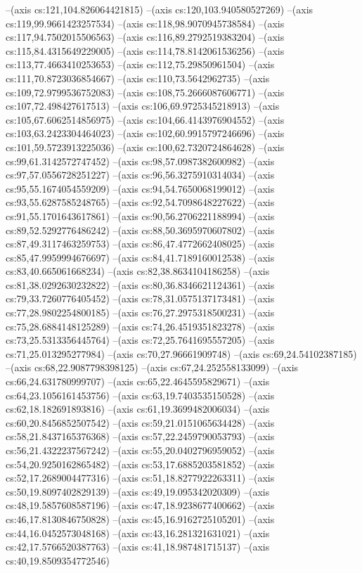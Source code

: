 --(axis cs:121,104.826064421815)
--(axis cs:120,103.940580527269)
--(axis cs:119,99.9661423257534)
--(axis cs:118,98.9070945738584)
--(axis cs:117,94.7502015506563)
--(axis cs:116,89.2792519383204)
--(axis cs:115,84.4315649229005)
--(axis cs:114,78.8142061536256)
--(axis cs:113,77.4663410253653)
--(axis cs:112,75.29850961504)
--(axis cs:111,70.8723036854667)
--(axis cs:110,73.5642962735)
--(axis cs:109,72.9799536752083)
--(axis cs:108,75.2666087606771)
--(axis cs:107,72.498427617513)
--(axis cs:106,69.9725345218913)
--(axis cs:105,67.6062514856975)
--(axis cs:104,66.4143976904552)
--(axis cs:103,63.2423304464023)
--(axis cs:102,60.9915797246696)
--(axis cs:101,59.5723913225036)
--(axis cs:100,62.7320724864628)
--(axis cs:99,61.3142572747452)
--(axis cs:98,57.0987382600982)
--(axis cs:97,57.0556728251227)
--(axis cs:96,56.3275910314034)
--(axis cs:95,55.1674054559209)
--(axis cs:94,54.7650068199012)
--(axis cs:93,55.6287585248765)
--(axis cs:92,54.7098648227622)
--(axis cs:91,55.1701643617861)
--(axis cs:90,56.2706221188994)
--(axis cs:89,52.5292776486242)
--(axis cs:88,50.3695970607802)
--(axis cs:87,49.3117463259753)
--(axis cs:86,47.4772662408025)
--(axis cs:85,47.9959994676697)
--(axis cs:84,41.7189160012538)
--(axis cs:83,40.665061668234)
--(axis cs:82,38.8634104186258)
--(axis cs:81,38.0292630232822)
--(axis cs:80,36.8346621124361)
--(axis cs:79,33.7260776405452)
--(axis cs:78,31.0575137173481)
--(axis cs:77,28.9802254800185)
--(axis cs:76,27.2975318500231)
--(axis cs:75,28.6884148125289)
--(axis cs:74,26.4519351823278)
--(axis cs:73,25.5313356445764)
--(axis cs:72,25.7641695557205)
--(axis cs:71,25.013295277984)
--(axis cs:70,27.96661909748)
--(axis cs:69,24.54102387185)
--(axis cs:68,22.9087798398125)
--(axis cs:67,24.252558133099)
--(axis cs:66,24.631780999707)
--(axis cs:65,22.4645595829671)
--(axis cs:64,23.1056161453756)
--(axis cs:63,19.7403535150528)
--(axis cs:62,18.182691893816)
--(axis cs:61,19.3699482006034)
--(axis cs:60,20.8456852507542)
--(axis cs:59,21.0151065634428)
--(axis cs:58,21.8437165376368)
--(axis cs:57,22.2459790053793)
--(axis cs:56,21.4322237567242)
--(axis cs:55,20.0402796959052)
--(axis cs:54,20.9250162865482)
--(axis cs:53,17.6885203581852)
--(axis cs:52,17.2689004477316)
--(axis cs:51,18.8277922263311)
--(axis cs:50,19.8097402829139)
--(axis cs:49,19.095342020309)
--(axis cs:48,19.5857608587196)
--(axis cs:47,18.9238677400662)
--(axis cs:46,17.8130846750828)
--(axis cs:45,16.9162725105201)
--(axis cs:44,16.0452573048168)
--(axis cs:43,16.281321631021)
--(axis cs:42,17.5766520387763)
--(axis cs:41,18.987481715137)
--(axis cs:40,19.8509354772546)
